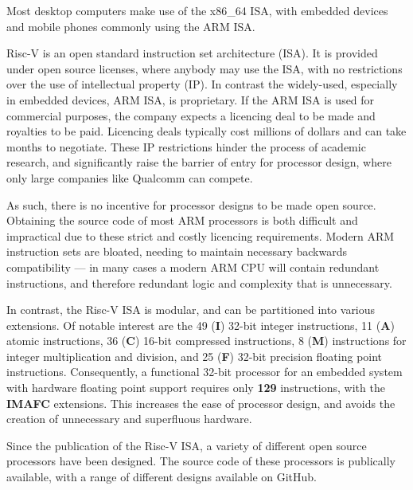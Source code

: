 \documentclass[a4paper,8pt]{report}
\begin{document}
Most desktop computers make use of the x86\_64 ISA, with embedded
devices and mobile phones commonly using the ARM ISA. 

Risc-V is an open standard instruction set architecture (ISA). It is provided
under open source licenses, where anybody may use the ISA, with no restrictions
over the use of intellectual property (IP). In contrast the widely-used,
especially in embedded devices, ARM ISA, is proprietary. If the ARM ISA is used
for commercial purposes, the company expects a licencing deal to be made and
royalties to be paid. Licencing deals typically cost millions of dollars and can
take months to negotiate. These IP restrictions hinder the process of academic
research, and significantly raise the barrier of entry for processor design,
where only large companies like Qualcomm can compete.

As such, there is no incentive for processor designs to be made open source.
Obtaining the source code of most ARM processors is both difficult and
impractical due to these strict and costly licencing requirements. Modern ARM
instruction sets are bloated, needing to maintain necessary backwards
compatibility --- in many cases a modern ARM CPU will contain redundant
instructions, and therefore redundant logic and complexity that is unnecessary.

In contrast, the Risc-V ISA is modular, and can be partitioned into various extensions. Of
notable interest are the 49 (\textbf{I}) 32-bit integer instructions, 11
(\textbf{A}) atomic instructions, 36 (\textbf{C}) 16-bit compressed instructions, 8
(\textbf{M}) instructions for integer multiplication and division, and 25
(\textbf{F}) 32-bit precision floating point instructions. Consequently, a functional 32-bit
processor for an embedded system with hardware floating point support requires
only \textbf{129} instructions, with the \textbf{IMAFC} extensions. This
increases the ease of processor design, and avoids the creation of unnecessary
and superfluous hardware. 



Since the publication of the Risc-V ISA, a variety of different open source
processors have been designed. The source code of these processors is publically
available, with a range of different designs available on GitHub. 
\end{document}
